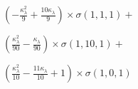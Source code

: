 $\left(- \frac{\kappa_{\lambda}^{2}}{9} + \frac{10 \kappa_{\lambda}}{9}\right) \times \sigma{\left(1,1,1 \right)} +$

$ \left(\frac{\kappa_{\lambda}^{2}}{90} - \frac{\kappa_{\lambda}}{90}\right) \times \sigma{\left(1,10,1 \right)} +$

$ \left(\frac{\kappa_{\lambda}^{2}}{10} - \frac{11 \kappa_{\lambda}}{10} + 1\right) \times \sigma{\left(1,0,1 \right)}$
